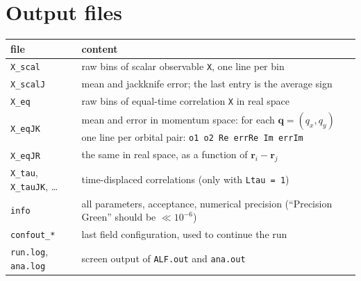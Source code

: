 \documentclass[11pt,a4paper]{article}
\newcommand{\f}[1]{\texttt{#1}}          %
\begin{document}
\section{Output files}

\begin{center}
\small
\begin{tabular}{lp{10.5cm}}
\toprule
file & content \\
\midrule
\f{X\_scal}        & raw bins of scalar observable \f{X}, one line per bin \\
\f{X\_scalJ}       & mean and jackknife error; the last entry is the average sign \\
\f{X\_eq}          & raw bins of equal-time correlation \f{X} in real space \\
\f{X\_eqJK}        & mean and error in momentum space: for each $\mathbf q=(q_x,q_y)$ one line
                     per orbital pair: \f{o1 o2 Re errRe Im errIm} \\
\f{X\_eqJR}        & the same in real space, as a function of $\mathbf r_i-\mathbf r_j$ \\
\f{X\_tau}, \f{X\_tauJK}, \dots & time-displaced correlations (only with \f{Ltau = 1}) \\
\f{info}           & all parameters, acceptance, numerical precision (``Precision Green'' should be $\ll10^{-6}$) \\
\f{confout\_*}     & last field configuration, used to continue the run \\
\f{run.log}, \f{ana.log} & screen output of \f{ALF.out} and \f{ana.out} \\
\bottomrule
\end{tabular}
\end{center}
\end{document}
